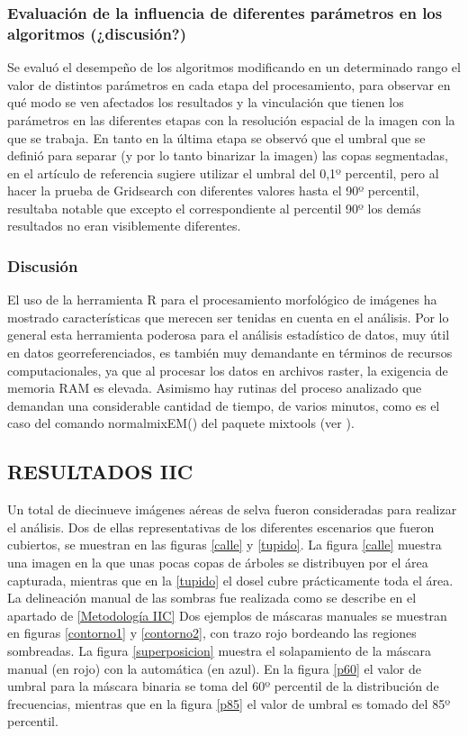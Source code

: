 

\subsubsection{Evaluación de la influencia de diferentes parámetros en los algoritmos (¿discusión?)}
Se evaluó el desempeño de los algoritmos modificando en un determinado rango el valor de distintos parámetros en cada etapa del procesamiento, para observar en qué modo se ven afectados los resultados y la vinculación que tienen los parámetros en las diferentes etapas con la resolución espacial de la imagen con la que se trabaja. En tanto en la última etapa se observó que el umbral
que se definió para separar (y por lo tanto binarizar la imagen) las copas segmentadas, en el artículo de referencia sugiere utilizar el umbral del 0,1º percentil, pero al hacer la prueba de Gridsearch con diferentes valores hasta el 90º percentil, resultaba notable que excepto el correspondiente al percentil 90º los demás resultados no eran visiblemente
diferentes.

\subsubsection{Discusión}
El uso de la herramienta R para el procesamiento morfológico de imágenes ha mostrado características que merecen ser tenidas en cuenta en el análisis. Por lo general esta herramienta poderosa para el análisis estadístico de datos, muy útil en datos georreferenciados, es también muy demandante en términos de recursos computacionales, ya que al procesar los datos en archivos raster, la exigencia de memoria RAM es elevada. Asimismo hay rutinas del proceso analizado que demandan una considerable cantidad de tiempo, de varios minutos, como es el caso del comando  normalmixEM() del paquete mixtools (ver \cite{young__aut_mixtools_2022}).


\subsection{RESULTADOS IIC} \label{Resultados IIC}
Un total de diecinueve imágenes aéreas de selva fueron consideradas para realizar el análisis. Dos de ellas representativas de los diferentes escenarios que fueron cubiertos, se muestran en las figuras \ref{calle} y \ref{tupido}. La figura \ref{calle} muestra una imagen en la que unas pocas copas de árboles se distribuyen por el área capturada, mientras que en la \ref{tupido} el dosel cubre prácticamente toda el área. La delineación manual de las sombras fue realizada como se describe en el apartado de \ref{Metodología IIC}
Dos ejemplos de máscaras manuales se muestran en figuras \ref{contorno1} y \ref{contorno2}, con trazo rojo bordeando las regiones sombreadas. La figura \ref{superposicion} muestra el solapamiento de la máscara manual (en rojo) con la automática (en azul). En la figura \ref{p60} el valor de umbral para la máscara binaria se toma del 60º percentil de la distribución de frecuencias, mientras que en la figura \ref{p85} el valor de umbral es tomado del 85º percentil.

